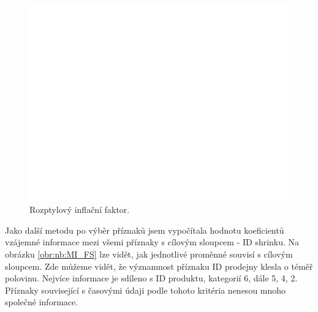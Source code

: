 \begin{figure}[h!]
      \centering
      \includegraphics[width=\textwidth]{obrazky/pripravadat/SFFVIF.png}
      \caption{Rozptylový inflační faktor.}
      \label{obr:nb:vif}

    \end{figure}

Jako další metodu po výběr příznaků jsem vypočítala hodnotu koeficientů vzájemné informace mezi všemi příznaky s cílovým sloupcem - ID shrinku. Na obrázku \ref*{obr:nb:MI_FS} lze vidět, jak jednotlivé proměnné souvisí s cílovým sloupcem. 
Zde můžeme vidět, že významnost příznaku ID prodejny klesla o téměř polovinu. Nejvíce informace je sdíleno s ID produktu, kategorií 6, dále 5, 4, 2. Příznaky související s časovými údaji podle tohoto kritéria nenesou mnoho společné informace.

